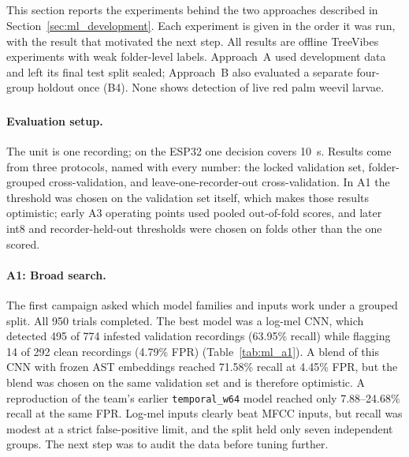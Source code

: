 \subsection{}
\label{sec:ml_results}
\begingroup
\color{black}
\setlength{\emergencystretch}{2em}\sloppy
This section reports the experiments behind the two approaches described in Section~\ref{sec:ml_development}. Each experiment is given in the order it was run, with the result that motivated the next step. All results are offline TreeVibes experiments with weak folder-level labels. Approach~A used development data and left its final test split sealed; Approach~B also evaluated a separate four-group holdout once (B4). None shows detection of live red palm weevil larvae.

\subsubsection{}
\label{sec:ml_res_clip}

\paragraph{Evaluation setup.} The unit is one recording; on the ESP32 one decision covers 10~s. Results come from three protocols, named with every number: the locked validation set, folder-grouped cross-validation, and leave-one-recorder-out cross-validation. In A1 the threshold was chosen on the validation set itself, which makes those results optimistic; early A3 operating points used pooled out-of-fold scores, and later int8 and recorder-held-out thresholds were chosen on folds other than the one scored.

\paragraph{A1: Broad search.} The first campaign asked which model families and inputs work under a grouped split. All 950 trials completed. The best model was a log-mel CNN, which detected 495 of 774 infested validation recordings (63.95\% recall) while flagging 14 of 292 clean recordings (4.79\% FPR) (Table~\ref{tab:ml_a1}). A blend of this CNN with frozen AST embeddings reached 71.58\% recall at 4.45\% FPR, but the blend was chosen on the same validation set and is therefore optimistic. A reproduction of the team's earlier \texttt{temporal\_w64} model reached only 7.88--24.68\% recall at the same FPR. Log-mel inputs clearly beat MFCC inputs, but recall was modest at a strict false-positive limit, and the split held only seven independent groups. The next step was to audit the data before tuning further.


